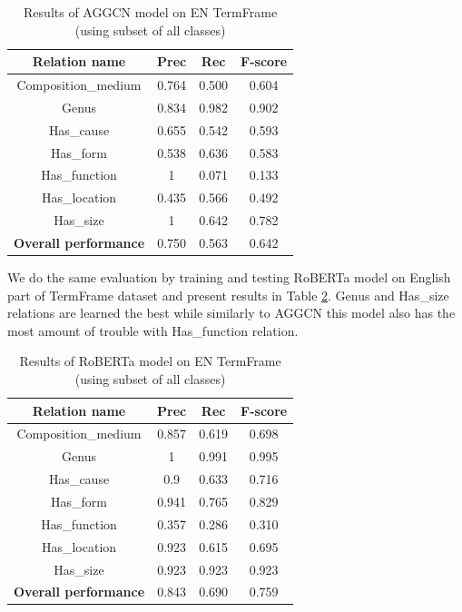 \documentclass[fleqn,moreauthors,10pt]{ds_report}
\begin{document}
\begin{table}[!ht]
    \centering
    \begin{tabular}{|c|c|c|c|}
        \hline
        \textbf{Relation name} & \textbf{Prec} & \textbf{Rec} & \textbf{F-score} \\ \hline \hline
        Composition\_medium  &  0.764  &  0.500  &  0.604 \\ \hline
        Genus               &  0.834  &  0.982  &  0.902 \\ \hline
        Has\_cause           &  0.655  &  0.542  &  0.593 \\ \hline
        Has\_form           &  0.538  &  0.636  &  0.583 \\ \hline
        Has\_function        & 1  &   0.071  &  0.133 \\ \hline
        Has\_location        &  0.435  &  0.566  &  0.492 \\ \hline
        Has\_size            & 1 &  0.642  &  0.782 \\ \hline \hline
        \textbf{Overall performance} & 0.750 & 0.563 & 0.642 \\ \hline
    \end{tabular}
    \caption{Results of AGGCN model on EN TermFrame (using subset of all classes)}
    \label{tab:karst_subset}
\end{table}


\par We do the same evaluation by training and testing RoBERTa model on English part of TermFrame dataset and present results in Table \ref{tab:karst_subset_bert}. Genus and Has\_size relations are learned the best while similarly to AGGCN this model also has the most amount of trouble with Has\_function relation.

\begin{table}[!ht]
    \centering
    \begin{tabular}{|c|c|c|c|}
        \hline
        \textbf{Relation name} & \textbf{Prec} & \textbf{Rec} & \textbf{F-score} \\ \hline \hline
        Composition\_medium  &  0.857  &  0.619  &  0.698 \\ \hline
        Genus               &  1  &  0.991  &  0.995 \\ \hline
        Has\_cause           &  0.9  &  0.633  &  0.716 \\ \hline
        Has\_form           &  0.941  &  0.765  &  0.829 \\ \hline
        Has\_function        & 0.357  &   0.286  &  0.310 \\ \hline
        Has\_location        &  0.923  &  0.615  &  0.695 \\ \hline
        Has\_size            & 0.923 &  0.923  &  0.923 \\ \hline \hline
        \textbf{Overall performance} & 0.843 & 0.690 & 0.759 \\ \hline
    \end{tabular}
    \caption{Results of RoBERTa model on EN TermFrame (using subset of all classes)}
    \label{tab:karst_subset_bert}
\end{table}
\end{document}

